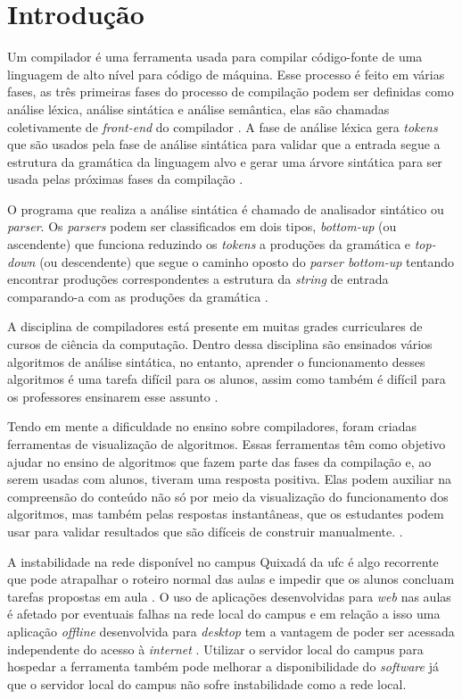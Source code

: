 \chapter{Introdução}
\label{cap:introducao}

Um compilador é uma ferramenta usada para compilar código-fonte de uma linguagem de alto nível para código de máquina. Esse processo é feito em várias fases, as três primeiras fases do processo de compilação podem ser definidas como análise léxica, análise sintática e análise semântica, elas são chamadas coletivamente de \textit{front-end} do compilador \cite{mogensen2024introduction}. A fase de análise léxica gera \textit{tokens} que são usados pela fase de análise sintática para validar que a entrada segue a estrutura da gramática da linguagem alvo e gerar uma árvore sintática para ser usada pelas próximas fases da compilação \cite{thain2020introduction}.

O programa que realiza a análise sintática é chamado de analisador sintático ou \textit{parser}. Os \textit{parsers} podem ser classificados em dois tipos, \textit{bottom-up} (ou ascendente) que funciona reduzindo os \textit{tokens} a produções da gramática e \textit{top-down} (ou descendente) que segue o caminho oposto do \textit{parser bottom-up} tentando encontrar produções correspondentes a estrutura da \textit{string} de entrada comparando-a com as produções da gramática \cite{cooper2022engineering}.

A disciplina de compiladores está presente em muitas grades curriculares de cursos de ciência da computação. Dentro dessa disciplina são ensinados vários algoritmos de análise sintática, no entanto, aprender o funcionamento desses algoritmos é uma tarefa difícil para os alunos, assim como também é difícil para os professores ensinarem esse assunto \cite{sangal2018pavt}.

Tendo em mente a dificuldade no ensino sobre compiladores, foram criadas ferramentas de visualização de algoritmos. Essas ferramentas têm como objetivo ajudar no ensino de algoritmos que fazem parte das fases da compilação e, ao serem usadas com alunos, tiveram uma resposta positiva. Elas podem auxiliar na compreensão do conteúdo não só por meio da visualização do funcionamento dos algoritmos, mas também pelas respostas instantâneas, que os estudantes podem usar para validar resultados que são difíceis de construir manualmente. \cite{10.1145/3002136}.

A instabilidade na rede disponível no campus Quixadá da \gls{ufc} é algo recorrente que pode atrapalhar o roteiro normal das aulas e impedir que os alunos concluam tarefas propostas em aula \cite{perez2023impact}. O uso de aplicações desenvolvidas para \textit{web} nas aulas é afetado por eventuais falhas na rede local do campus e em relação a isso uma aplicação \textit{offline} desenvolvida para \textit{desktop} tem a vantagem de poder ser acessada independente do acesso à \textit{internet} \cite{holzer2012mobile}. Utilizar o servidor local do campus para hospedar a ferramenta também pode melhorar a disponibilidade do \textit{software} já que o servidor local do campus não sofre instabilidade como a rede local.

